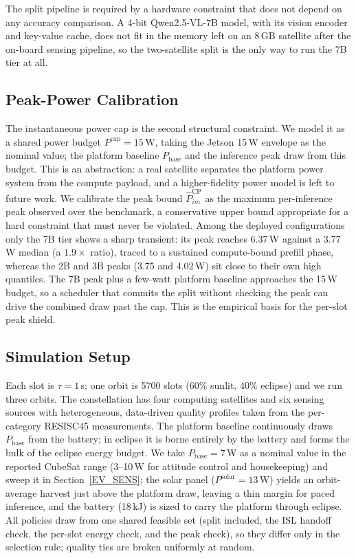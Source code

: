 The split pipeline is required by a hardware constraint that does not depend on
any accuracy comparison. A 4-bit Qwen2.5-VL-7B model, with its vision encoder and
key-value cache, does not fit in the memory left on an 8\,GB satellite after the
on-board sensing pipeline, so the two-satellite split is the only way to run the
7B tier at all.

\subsection{Peak-Power Calibration}\label{EV_PEAK}
The instantaneous power cap is the second structural constraint. We model it as a
shared power budget $P^{\text{cap}}{=}15$\,W, taking the Jetson 15\,W envelope as
the nominal value; the platform baseline $P_{\text{base}}$ and the inference peak
draw from this budget. This is an abstraction: a real satellite separates the
platform power system from the compute payload, and a higher-fidelity power model
is left to future work. We calibrate the peak bound $\hat{P}_{im}^{\text{CP}}$ as
the maximum per-inference peak observed over the benchmark, a conservative upper
bound appropriate for a hard constraint that must never be violated. Among the
deployed configurations only the 7B tier shows a sharp transient: its peak reaches
6.37\,W against a 3.77\,W median (a $1.9\times$ ratio), traced to a sustained
compute-bound prefill phase, whereas the 2B and 3B peaks (3.75 and 4.02\,W) sit
close to their own high quantiles. The 7B peak plus a few-watt platform baseline
approaches the 15\,W budget, so a scheduler that commits the split without
checking the peak can drive the combined draw past the cap. This is the empirical
basis for the per-slot peak shield.

\subsection{Simulation Setup}\label{EV_SETUP}
Each slot is $\tau{=}1$\,s; one orbit is 5700 slots (60\% sunlit, 40\% eclipse) and
we run three orbits. The constellation has four computing satellites and six
sensing sources with heterogeneous, data-driven quality profiles taken from the
per-category RESISC45 measurements. The platform baseline continuously draws
$P_{\text{base}}$ from the battery; in eclipse it is borne entirely by the battery
and forms the bulk of the eclipse energy budget. We take $P_{\text{base}}{=}7$\,W
as a nominal value in the reported CubeSat range (3--10\,W for attitude control and
housekeeping) and sweep it in Section~\ref{EV_SENS}; the solar panel
($P^{\text{solar}}{=}13$\,W) yields an orbit-average harvest just above the
platform draw, leaving a thin margin for paced inference, and the battery
(18\,kJ) is sized to carry the platform through eclipse. All policies draw from
one shared feasible set (split included, the ISL handoff check, the per-slot
energy check, and the peak check), so they differ only in the selection rule;
quality ties are broken uniformly at random.

